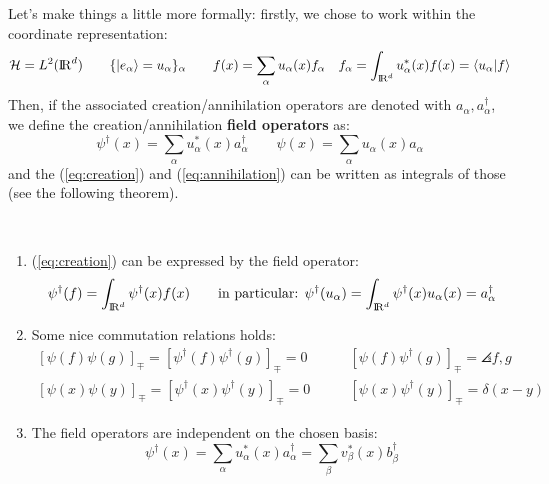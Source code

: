 Let's make things a little more formally: firstly, we chose to work within the coordinate representation:\\
$$\mathcal{H} = L^2({\rm I\!R}^d) \qquad \{\left|e_\alpha\right\rangle = u_\alpha\}_\alpha \qquad f(x) = \sum_\alpha u_\alpha(x) f_\alpha \quad f_\alpha = \int_{{\rm I\!R}^d} u^*_\alpha(x) f(x) = \left\langle u_\alpha \middle| f \right\rangle$$
Then, if the associated creation/annihilation operators are denoted with $a_\alpha,a_\alpha^\dag$, we define the creation/annihilation \textbf{field operators} as:
$$\psi^\dag(x) = \sum_\alpha u_\alpha^*(x)a_\alpha^\dag \qquad \psi(x) = \sum_\alpha u_\alpha(x) a_\alpha$$
and the (\ref{eq:creation}) and (\ref{eq:annihilation}) can be written as integrals of those (see the following theorem).

\\

\Th \begin{enumerate}[label=\roman*)]
    \item (\ref{eq:creation}) can be expressed by the field operator:
    $$\psi^\dag(f) = \int_{{\rm I\!R}^d} \psi^\dag(x) f(x) \qquad \text{in particular: } \psi^\dag(u_\alpha) = \int_{{\rm I\!R}^d} \psi^\dag(x)u_\alpha(x) = a_\alpha^\dag$$
    
    \item Some nice commutation relations holds:
    \begin{align*}
        \left[\psi(f) \psi(g)\right]_\mp = \left[\psi^\dag(f) \psi^\dag(g)\right]_\mp = 0& \qquad \left[\psi(f) \psi^\dag(g)\right]_\mp = \angles{f,g}\\
        \left[\psi(x) \psi(y)\right]_\mp = \left[\psi^\dag(x) \psi^\dag(y)\right]_\mp = 0& \qquad \left[\psi(x) \psi^\dag(y)\right]_\mp = \delta(x-y)
    \end{align*}

    \item The field operators are independent on the chosen basis: 
    $$\psi^\dag(x) = \sum_\alpha u^*_\alpha(x) a_\alpha^\dag = \sum_\beta v_\beta^*(x) b_\beta^\dag$$
\end{enumerate}

